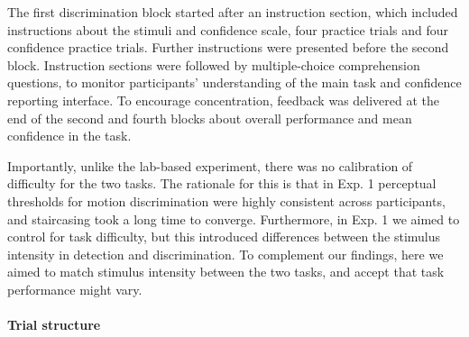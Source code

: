 \documentclass[12pt,twoside]{reedthesis}
\begin{document}
The first discrimination block started after an instruction section, which included instructions about the stimuli and confidence scale, four practice trials and four confidence practice trials. Further instructions were presented before the second block. Instruction sections were followed by multiple-choice comprehension questions, to monitor participants' understanding of the main task and confidence reporting interface. To encourage concentration, feedback was delivered at the end of the second and fourth blocks about overall performance and mean confidence in the task.

Importantly, unlike the lab-based experiment, there was no calibration of difficulty for the two tasks. The rationale for this is that in Exp. 1 perceptual thresholds for motion discrimination were highly consistent across participants, and staircasing took a long time to converge. Furthermore, in Exp. 1 we aimed to control for task difficulty, but this introduced differences between the stimulus intensity in detection and discrimination. To complement our findings, here we aimed to match stimulus intensity between the two tasks, and accept that task performance might vary.

\hypertarget{trial-structure}{%
\paragraph{Trial structure}\label{trial-structure}}
\end{document}
